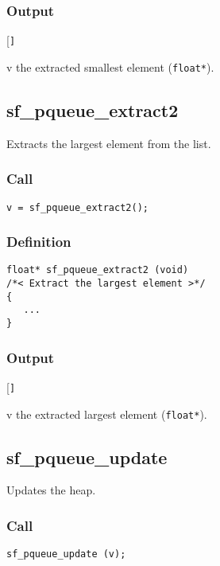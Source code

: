 \subsubsection*{Output}
\begin{desclist}{\tt }{\quad}[\tt ]
   \setlength\itemsep{0pt}
   \item[v] the extracted smallest element (\texttt{float*}).  
\end{desclist}




\subsection{{sf\_pqueue\_extract2}}
Extracts the largest element from the list.

\subsubsection*{Call}
\begin{verbatim}v = sf_pqueue_extract2();\end{verbatim}

\subsubsection*{Definition}
\begin{verbatim}
float* sf_pqueue_extract2 (void)
/*< Extract the largest element >*/
{
   ...
}
\end{verbatim}

\subsubsection*{Output}
\begin{desclist}{\tt }{\quad}[\tt ]
   \setlength\itemsep{0pt}
   \item[v] the extracted largest element (\texttt{float*}).  
\end{desclist}





\subsection{{sf\_pqueue\_update}}
Updates the heap.

\subsubsection*{Call}
\begin{verbatim}sf_pqueue_update (v);\end{verbatim}

